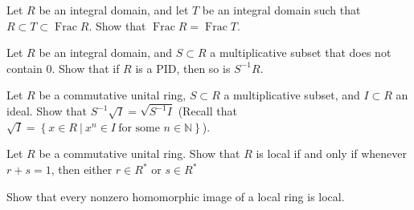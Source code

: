 \documentclass{problemset}
\DeclareMathOperator{\Frac}{Frac}
\begin{document}
\begin{exercise} Let \(R\) be an integral domain, and let \(T\) be an integral domain such that \(R \subset T \subset \Frac R\).  Show that \(\Frac R = \Frac T\).

\end{exercise}


\begin{exercise}
Let \(R\) be an integral domain, and \(S \subset R\) a multiplicative subset that does not contain \(0\). Show that if \(R\) is a PID, then so is \(S^{-1}R\).
\end{exercise}


\begin{exercise}
Let \(R\) be a commutative unital ring, \(S \subset R\) a multiplicative subset, and \(I \subset R\) an ideal.  Show that \(S^{-1}\sqrt{I}=\sqrt{S^{-1}I}\) (Recall that \(\sqrt{I}=\left\{x \in R\ |\ x^n \in I\ \text{for some }n \in \mathbb{N}\right\}\)).
\end{exercise}



\begin{exercise}
Let \(R\) be a commutative unital ring.  Show that \(R\) is local if and only if whenever \(r+s=1\), then either \(r \in R^*\) or \(s \in R^*\)
\end{exercise}


\begin{exercise}
Show that every nonzero homomorphic image of a local ring is local.
\end{exercise}



\end{document}
